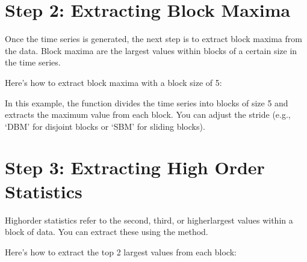 \documentclass[a4paper,11pt,openany,english]{sphinxmanual}
\begin{document}
\section{Step 2: Extracting Block Maxima}
\label{\detokenize{topt:step-2-extracting-block-maxima}}
\sphinxAtStartPar
Once the time series is generated, the next step is to extract block maxima from the data. Block maxima are the largest values within blocks of a certain size in the time series.

\sphinxAtStartPar
Here’s how to extract block maxima with a block size of 5:

\begin{sphinxVerbatim}[commandchars=\\\{\}]
 

\end{sphinxVerbatim}

\sphinxAtStartPar
In this example, the  function divides the time series into blocks of size 5 and extracts the maximum value from each block. You can adjust the stride (e.g., ‘DBM’ for disjoint blocks or ‘SBM’ for sliding blocks).


\section{Step 3: Extracting High Order Statistics}
\label{\detokenize{topt:step-3-extracting-high-order-statistics}}
\sphinxAtStartPar
High\sphinxhyphen{}order statistics refer to the second, third, or higher\sphinxhyphen{}largest values within a block of data. You can extract these using the  method.

\sphinxAtStartPar
Here’s how to extract the top 2 largest values from each block:

\begin{sphinxVerbatim}[commandchars=\\\{\}]
  

\end{sphinxVerbatim}
\end{document}

